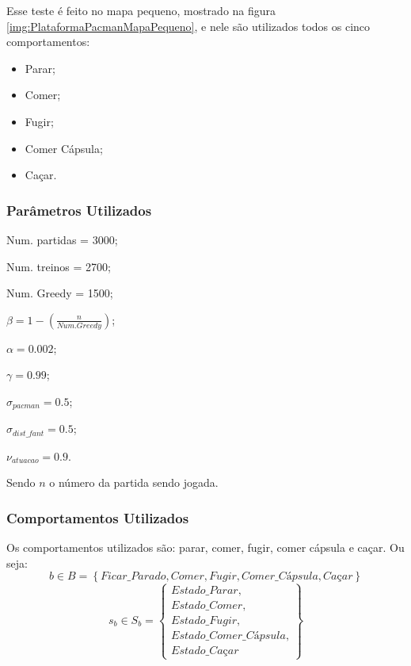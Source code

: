 Esse teste é feito no mapa pequeno, mostrado na figura \ref{img:PlataformaPacmanMapaPequeno}, e nele são utilizados todos os cinco comportamentos:

\begin{itemize}
	\item Parar;
	\item Comer;
	\item Fugir;
	\item Comer Cápsula;
	\item Caçar.
\end{itemize}

\subsubsection{Parâmetros Utilizados}

\begin{multicols}{2}

Num. partidas = 3000;

Num. treinos = 2700;

Num. Greedy = 1500;

$ \beta = 1 - \left( \frac{n}{Num. Greedy} \right) $;

$ \alpha = 0.002 $;

$ \gamma = 0.99 $;

$ \sigma_{pacman} = 0.5 $;

$ \sigma_{dist\_fant} = 0.5 $;

$ \nu_{atuacao} = 0.9 $.

\end{multicols}

Sendo $ n $ o número da partida sendo jogada.


\subsubsection{Comportamentos Utilizados} \label{subsubsection:5ComportamentosUtilizados}

Os comportamentos utilizados são: parar, comer, fugir, comer cápsula e caçar. Ou seja:
$$ b \in B = \left\{ Ficar\_Parado, Comer, Fugir, \textit{Comer\_Cápsula}, \textit{Caçar} \right\} $$
$$ s_b \in S_b = 
        \left\{
            \begin{array}{l}
                Estado\_Parar, \\
                Estado\_Comer, \\
                Estado\_Fugir, \\
                \textit{Estado\_Comer\_Cápsula}, \\
                \textit{Estado\_Caçar}
            \end{array}
        \right\}
         $$

